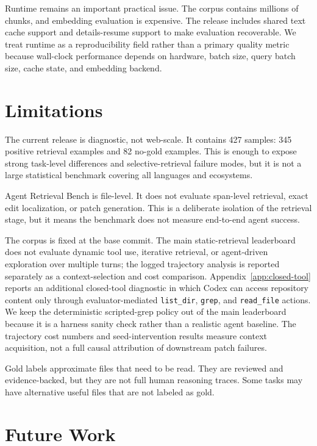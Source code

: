 \documentclass[11pt]{article}
\newcommand{\arb}{Agent Retrieval Bench}
\newcommand{\code}[1]{\texttt{#1}}
\begin{document}
Runtime remains an important practical issue. The corpus contains millions of chunks, and embedding evaluation is expensive. The release includes shared text cache support and details-resume support to make evaluation recoverable. We treat runtime as a reproducibility field rather than a primary quality metric because wall-clock performance depends on hardware, batch size, query batch size, cache state, and embedding backend.

\section{Limitations}

The current release is diagnostic, not web-scale. It contains 427 samples: 345 positive retrieval examples and 82 no-gold examples. This is enough to expose strong task-level differences and selective-retrieval failure modes, but it is not a large statistical benchmark covering all languages and ecosystems.

\arb{} is file-level. It does not evaluate span-level retrieval, exact edit localization, or patch generation. This is a deliberate isolation of the retrieval stage, but it means the benchmark does not measure end-to-end agent success.

The corpus is fixed at the base commit. The main static-retrieval leaderboard does not evaluate dynamic tool use, iterative retrieval, or agent-driven exploration over multiple turns; the logged trajectory analysis is reported separately as a context-selection and cost comparison. Appendix~\ref{app:closed-tool} reports an additional closed-tool diagnostic in which Codex can access repository content only through evaluator-mediated \code{list\_dir}, \code{grep}, and \code{read\_file} actions. We keep the deterministic scripted-grep policy out of the main leaderboard because it is a harness sanity check rather than a realistic agent baseline. The trajectory cost numbers and seed-intervention results measure context acquisition, not a full causal attribution of downstream patch failures.

Gold labels approximate files that need to be read. They are reviewed and evidence-backed, but they are not full human reasoning traces. Some tasks may have alternative useful files that are not labeled as gold.

\section{Future Work}
\end{document}

